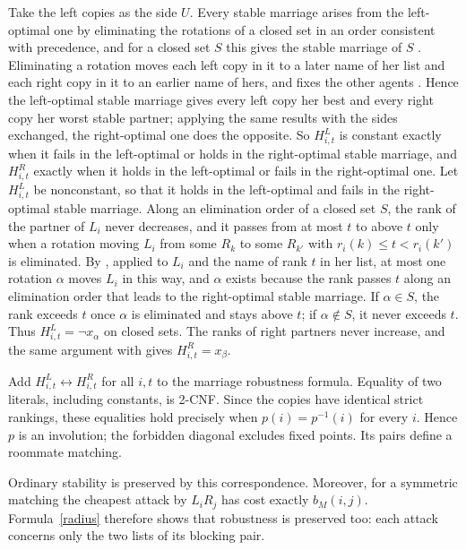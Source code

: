 \documentclass[11pt]{article}
\begin{document}
Take the left copies as the side $U$. Every stable marriage arises from
the left-optimal one by eliminating the rotations of a closed set in an
order consistent with precedence, and for a closed set $S$ this gives the
stable marriage of $S$ \cite[Proposition 3.9(i) and \S3.4, p.~24]{css}.
Eliminating a rotation moves each left copy in it to a later name of her
list and each right copy in it to an earlier name of hers, and fixes the
other agents \cite[Definition 3.4]{css}. Hence the left-optimal stable
marriage gives every left copy her best and every right copy her worst
stable partner; applying the same results with the sides exchanged, the
right-optimal one does the opposite. So $H^L_{i,t}$ is constant exactly
when it fails in the left-optimal or holds in the right-optimal stable
marriage, and $H^R_{i,t}$ exactly when it holds in the left-optimal or
fails in the right-optimal one. Let $H^L_{i,t}$ be nonconstant, so that it
holds in the left-optimal and fails in the right-optimal stable marriage.
Along an elimination order of a closed set $S$, the rank of the partner of
$L_i$ never decreases, and it passes from at most $t$ to above $t$ only
when a rotation moving $L_i$ from some $R_k$ to some $R_{k'}$ with
$r_i(k)\leq t<r_i(k')$ is eliminated. By \cite[Proposition 3.6(ii)]{css},
applied to $L_i$ and the name of rank $t$ in her list, at most one
rotation $\alpha$ moves $L_i$ in this way, and $\alpha$ exists because the
rank passes $t$ along an elimination order that leads to the right-optimal
stable marriage. If $\alpha\in S$, the rank exceeds $t$ once $\alpha$ is
eliminated and stays above $t$; if $\alpha\notin S$, it never exceeds $t$.
Thus $H^L_{i,t}=\neg x_\alpha$ on closed sets. The ranks of right partners
never increase, and the same argument with \cite[Proposition 3.6(iv)]{css}
gives $H^R_{i,t}=x_\beta$.

Add $H^L_{i,t}\leftrightarrow H^R_{i,t}$ for all $i,t$ to the marriage
robustness formula. Equality of two literals, including constants, is
2-CNF. Since the copies have identical strict rankings, these equalities
hold precisely when $p(i)=p^{-1}(i)$ for every $i$. Hence $p$ is an
involution; the forbidden diagonal excludes fixed points. Its pairs
define a roommate matching.

Ordinary stability is preserved by this correspondence. Moreover, for
a symmetric matching the cheapest attack by $L_iR_j$ has cost exactly
$b_M(i,j)$. Formula~\eqref{radius} therefore shows that robustness is
preserved too: each attack concerns only the two lists of its blocking pair.
\end{document}
